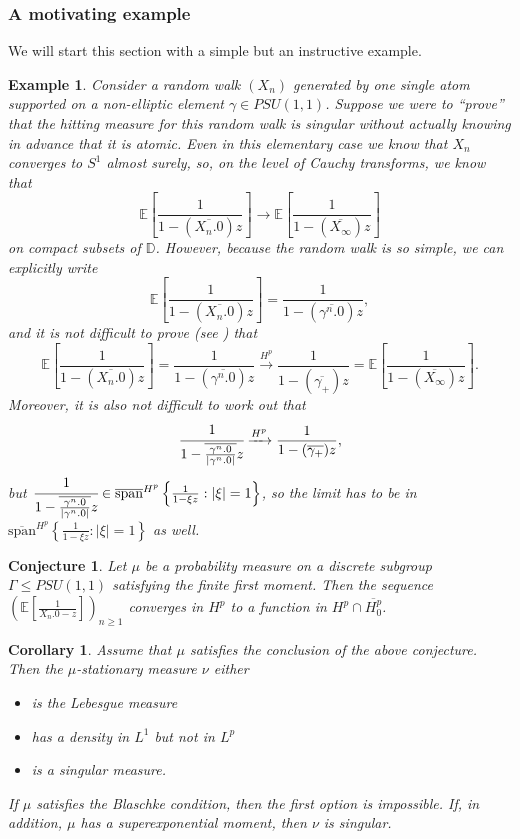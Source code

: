 \documentclass[11pt]{article}
\newtheorem{corollary}{Corollary}[section]
\newtheorem{example}{Example}[section]
\newtheorem{conjecture}{Conjecture}[section]
\begin{document}
\subsubsection{A motivating example}
We will start this section with a simple but an instructive example.
\begin{example}
	Consider a random walk $(X_n)$ generated by one single atom supported on a non-elliptic element $\gamma \in PSU(1,1)$. Suppose we were to ``prove'' that the hitting measure for this random walk is singular without actually knowing in advance that it is atomic. Even in this elementary case we know that $X_n$ converges to $S^1$ almost surely, so, on the level of Cauchy transforms, we know that 
	\[
	\mathbb{E}\left[\frac{1}{1 - (\overline{X_n.0}) z}\right] \rightarrow \mathbb{E}\left[\frac{1}{1 - (\overline{X_\infty})z}\right]
	\]
	on compact subsets of $\mathbb{D}$. However, because the random walk is so simple, we can explicitly write
	\[
	\mathbb{E}\left[\frac{1}{1 - (\overline{X_n.0}) z} \right] = \frac{1}{1 - (\overline{\gamma^n.0}) z},
	\]
	and it is not difficult to prove (see \cite[Lemma 6.2.23]{cimahardy}) that
	\[
	\mathbb{E}\left[\frac{1}{1 - (\overline{X_n.0}) z} \right] = \frac{1}{1 - (\overline{\gamma^n.0}) z} \xrightarrow{H^p} \frac{1}{1 - (\overline{\gamma_+}) z} = \mathbb{E}\left[ \frac{1}{1 - (\overline{X_\infty}) z} \right].
	\]
	Moreover, it is also not difficult to work out that
	\[
	\cfrac{1}{1 - \overline{\frac{\gamma^n.0}{|\gamma^n.0|}} z} \xrightarrow{H^p} \frac{1}{1 - (\overline{\gamma_+}) z},
	\]
	but $\cfrac{1}{1 - \overline{\frac{\gamma^n.0}{|\gamma^n.0|}} z} \in \overline{\text{span}}^{H^p} \left\lbrace \frac{1}{1 - \xi z} : |\xi| = 1 \right\rbrace$, so the limit has to be in $\overline{\text{span}}^{H^p} \left\lbrace \frac{1}{1 - \xi z} : |\xi| = 1 \right\rbrace$ as well.
\end{example}

\begin{conjecture}
	Let $\mu$ be a probability measure on a discrete subgroup $\Gamma \leq PSU(1,1)$ satisfying the finite first moment. Then the sequence $\left( \mathbb{E} \left[ \frac{1}{X_n.0 - z} \right]\right)_{n \ge 1} $ converges in $H^p$ to a function in $H^p \cap \overline{H^p_0}$.
\end{conjecture}

\begin{corollary}
	Assume that $\mu$ satisfies the conclusion of the above conjecture. Then the $\mu$-stationary measure $\nu$ either
	\begin{itemize}
		\item is the Lebesgue measure
		\item has a density in $L^1$ but not in $L^p$
		\item is a singular measure.
	\end{itemize}
	If $\mu$ satisfies the Blaschke condition, then the first option is impossible. If, in addition, $\mu$ has a superexponential moment, then $\nu$ is singular.
\end{corollary}
\end{document}
